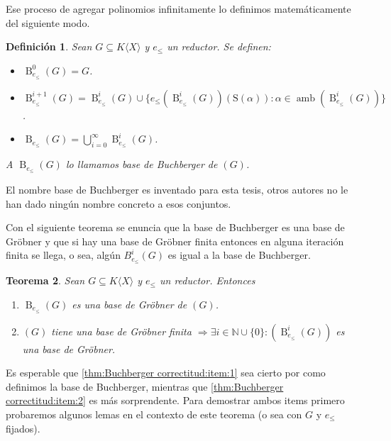 \documentclass[12pt]{report}
\theoremstyle{customstyle}
\newtheorem{theorem}{Teorema}[chapter]
\newtheorem{definition}[theorem]{Definición}
\theoremstyle{factstyle}
\DeclareMathOperator{\amb}{amb}
\renewcommand{\S}{\text{S}}
\DeclareMathOperator{\B}{B}
\begin{document}
Ese proceso de agregar polinomios infinitamente lo definimos matemáticamente del siguiente modo.

\begin{definition}
  Sean $G ⊆ K⟨X⟩$ y $e_≤$ un reductor. Se definen:
  \begin{itemize}
    \item $\B_{e_≤}^0(G) = G$.
    \item $\B_{e_≤}^{i + 1}(G) = \B_{e_≤}^i(G) ∪ \{e_≤(\B_{e_≤}^i(G))(\S(α)) : α ∈ \amb(\B_{e_≤}^i(G))\}$.
    \item $\B_{e_≤}(G) = ⋃_{i = 0}^∞ \B_{e_≤}^i(G)$.
  \end{itemize}
  A $\B_{e_≤}(G)$ lo llamamos base de Buchberger de $(G)$.
\end{definition}

El nombre base de Buchberger es inventado para esta tesis, otros autores no le han dado ningún nombre concreto a esos conjuntos.

Con el siguiente teorema se enuncia que la base de Buchberger es una base de Gröbner y que si hay una base de Gröbner finita entonces en alguna iteración finita se llega, o sea, algún $B_{e_≤}^{i}(G)$ es igual a la base de Buchberger.

\begin{theorem}\label{thm:Buchberger correctitud}
  Sean $G ⊆ K⟨X⟩$ y $e_≤$ un reductor. Entonces
  \begin{enumerate}
    \item $\B_{e_≤}(G)$ es una base de Gröbner de $(G)$. \label{thm:Buchberger correctitud:item:1}
    \item $(G)$ tiene una base de Gröbner finita $⇒ ∃i ∈ ℕ ∪ \{0\} : (\B_{e_≤}^i(G))$ es una base de Gröbner. \label{thm:Buchberger correctitud:item:2}
  \end{enumerate}
\end{theorem}

Es esperable que \ref{thm:Buchberger correctitud:item:1} sea cierto por como definimos la base de Buchberger, mientras que \ref{thm:Buchberger correctitud:item:2} es más sorprendente. Para demostrar ambos items primero probaremos algunos lemas en el contexto de este teorema (o sea con $G$ y $e_≤$ fijados).
\end{document}

